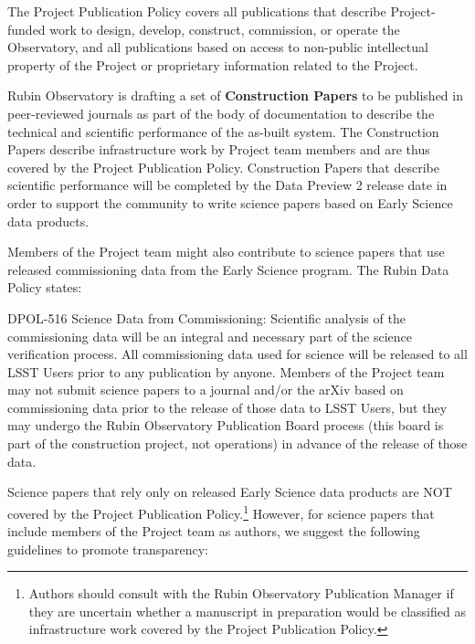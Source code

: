 \documentclass[SE,authoryear,toc,lsstdraft]{lsstdoc}
\begin{document}
The Project Publication Policy  covers all publications that describe Project-funded work to design, develop, construct, commission, or operate the Observatory, and all publications based on access to non-public intellectual property of the Project or proprietary information related to the Project.

Rubin Observatory is drafting a set of \textbf{Construction Papers} to be published in peer-reviewed journals as part of the body of documentation to describe the technical and scientific performance of the as-built system.
The Construction Papers describe infrastructure work by Project team members and are thus covered by the Project Publication Policy.
Construction Papers that describe scientific performance will be completed by the Data Preview 2 release date in order to support the community to write science papers based on Early Science data products.

Members of the Project team might also contribute to science papers that use released commissioning data from the Early Science program.
The Rubin Data Policy  states:

\begin{emph}
  {DPOL-516 Science Data from Commissioning: Scientific analysis of the commissioning data will be an integral and necessary part of the science verification process.
  All commissioning data used for science will be released to all LSST Users prior to any publication by anyone.
  Members of the Project team may not submit science papers to a journal and/or the arXiv based on commissioning data prior to the release of those data to LSST Users, but they may undergo the Rubin Observatory Publication Board process (this board is part of the construction project, not operations) in advance of the release of those data.}
\end{emph}



Science papers that rely only on released Early Science data products are NOT covered by the Project Publication Policy.\footnote{Authors should consult with the Rubin Observatory Publication Manager if they are uncertain whether a manuscript in preparation would be classified as infrastructure work covered by the Project Publication Policy.}
However, for science papers that include members of the Project team as authors, we suggest the following guidelines to promote transparency:
\end{document}
